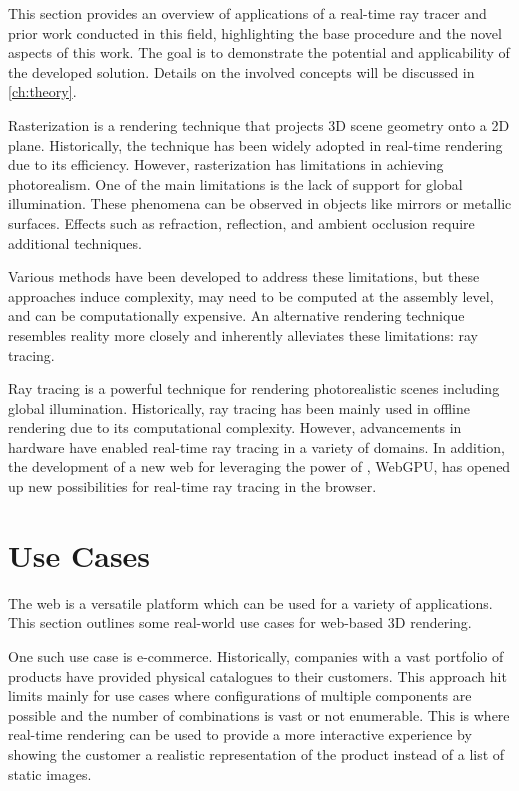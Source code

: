
This section provides an overview of applications of a real-time ray tracer and prior work conducted in this field, highlighting the base procedure and the novel aspects of this work. The goal is to demonstrate the potential and applicability of the developed solution. Details on the involved concepts will be discussed in \autoref{ch:theory}.

Rasterization is a rendering technique that projects 3D scene geometry onto a 2D plane. Historically, the technique has been widely adopted in real-time rendering due to its efficiency. However, rasterization has limitations in achieving photorealism. One of the main limitations is the lack of support for global illumination. These phenomena can be observed in objects like mirrors or metallic surfaces. Effects such as refraction, reflection, and ambient occlusion require additional techniques.

Various methods have been developed to address these limitations, but these approaches induce complexity, may need to be computed at the assembly level, and can be computationally expensive. An alternative rendering technique resembles reality more closely and inherently alleviates these limitations: ray tracing.

Ray tracing is a powerful technique for rendering photorealistic scenes including global illumination. Historically, ray tracing has been mainly used in offline rendering due to its computational complexity. However, advancements in hardware have enabled real-time ray tracing in a variety of domains. In addition, the development of a new web  for leveraging the power of , WebGPU, has opened up new possibilities for real-time ray tracing in the browser.

\section{Use Cases}

The web is a versatile platform which can be used for a variety of applications. This section outlines some real-world use cases for web-based 3D rendering.

One such use case is e-commerce. Historically, companies with a vast portfolio of products have provided physical catalogues to their customers. This approach hit limits mainly for use cases where configurations of multiple components are possible and the number of combinations is vast or not enumerable. This is where real-time rendering can be used to provide a more interactive experience by showing the customer a realistic representation of the product instead of a list of static images.


